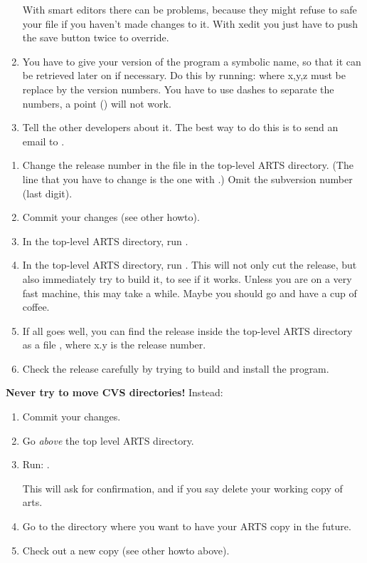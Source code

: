 \begin{enumerate}
  With smart editors there can be problems, because they might
  refuse to safe your file if you haven't made changes to it. With
  xedit you just have to push the save button twice to override.
\item You have to give your version of the program a symbolic name, so
  that it can be retrieved later on if necessary. Do this by running:
   where x,y,z must be replace by the version
  numbers. You have to use dashes to separate the numbers, a point
  () will not work.
\item Tell the other developers about it. The best way to do this is
  to send an email to .
\end{enumerate}


\label{sec:release}
\begin{enumerate}
\item Change the release number in the file  in the
  top-level ARTS directory. (The line that you have to change is the
  one with .) Omit the subversion number (last digit).
\item Commit your changes (see other howto). 
\item In the top-level ARTS directory, run .
\item In the top-level ARTS directory, run . This
  will not only cut the release, but also immediately try to build
  it, to see if it works. Unless you are on a very fast machine, this
  may take a while. Maybe you should go and have a cup of coffee.
\item If all goes well, you can find the release inside the top-level
  ARTS directory as a file , where x.y is the
  release number.
\item Check the release carefully by trying to build and install the
  program. 
\end{enumerate}


\textbf{Never try to move CVS directories!} Instead:
\begin{enumerate}
\item Commit your changes.
\item Go \emph{above} the top level ARTS directory.
\item Run: .
  
  This will ask for confirmation, and if you say  delete your
  working copy of arts.
\item Go to the directory where you want to have your ARTS copy in the
  future.
\item Check out a new copy (see other howto above).
\end{enumerate}

